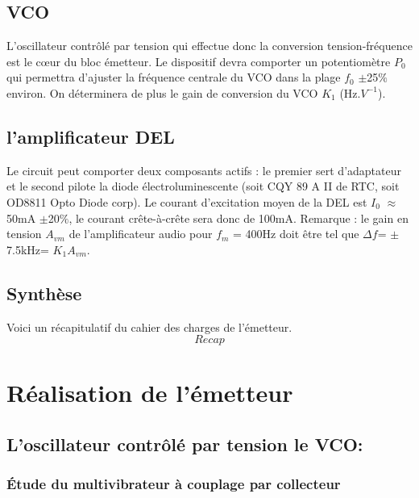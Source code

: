 \documentclass[a4paper]{report}
\begin{document}
\section{VCO}

L'oscillateur contrôlé par tension qui effectue donc la conversion tension-fréquence est le cœur du bloc émetteur. Le dispositif devra comporter un potentiomètre $P_0$ qui permettra d'ajuster la fréquence centrale du VCO dans la plage $f_0$ $\pm$25$\%$ environ. On déterminera de plus le gain de conversion du VCO $K_1$ (Hz.$V^{-1}$).

\section{l'amplificateur DEL}

Le circuit peut comporter deux composants actifs : le premier sert d'adaptateur et le second pilote la diode électroluminescente (soit CQY 89 A II de RTC, soit OD8811 Opto Diode corp). Le courant d'excitation moyen de la DEL est $I_0$ $\approx$ 50mA $\pm$20$\%$, le courant crête-à-crête sera donc de 100mA.
Remarque :  le gain en tension $A_{vm}$ de l'amplificateur audio pour $f_m$ = 400Hz doit être tel que $\Delta f$= $\pm$7.5kHz= $K_1A_{vm}$.

\section{Synthèse}

Voici un récapitulatif du cahier des charges de l'émetteur.\\

$$Recap$$


\chapter{Réalisation de l'émetteur}

\section{L'oscillateur contrôlé par tension le VCO:}

\subsection{Étude du multivibrateur à couplage par collecteur}
\end{document}
